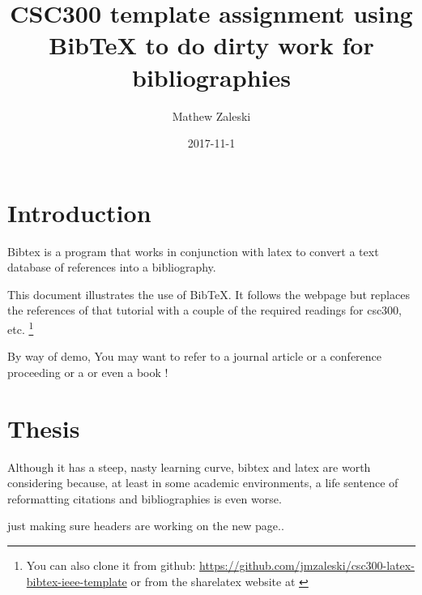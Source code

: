 \documentclass{article}
\begin{document}
\title{CSC300 template assignment using BibTeX to do dirty work for bibliographies}
\author{Mathew Zaleski}
\date{2017-11-1}

\maketitle
\thispagestyle{fancy}
\section{Introduction}

Bibtex \cite{original-bibtex,bibtex} is a program that works in
conjunction with latex to convert
a text database of references into a bibliography. 

This document illustrates the use of BibTeX\@.  It follows  the webpage
\cite{bibtex-tutorial}  but replaces the references of that tutorial
with a couple of the required readings for csc300, etc. \footnote{You can also clone it from github: \url{https://github.com/jmzaleski/csc300-latex-bibtex-ieee-template}
or from the sharelatex website at \cite{shared-latex-page}}


By way of demo, You may want to refer to a journal article \cite{warren-brandeis-1890}
or a conference proceeding \cite{siva05} or a \cite{gosling-interview}
or even a book \cite {java-jvm-spec}!

\section{Thesis}

Although it has a steep, nasty learning curve, bibtex and latex are
worth considering because, at least in some academic environments, a
life sentence of reformatting citations and bibliographies is even
worse.


\newpage

just making sure headers are working on the new page..




\end{document}
